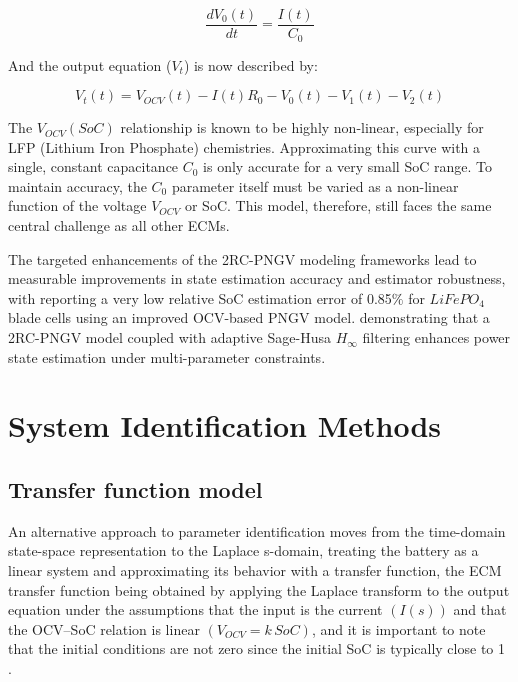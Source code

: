 \documentclass[lettersize,journal]{IEEEtran}
\begin{document}
\begin{equation}
	\label{eq:v0_pngv}
	\frac{dV_0(t)}{dt} =  \frac{I(t)}{C_0}
\end{equation}

And the output equation ($V_t$) is now described by:

\begin{equation}
	\label{eq:vt_pngv}
	V_t(t) = V_{OCV}(t) - I(t)R_0 - V_0(t)-V_1(t)-V_2(t)
\end{equation}

The $V_{OCV}(SoC)$ relationship is known to be highly non-linear, especially for LFP (Lithium Iron Phosphate) chemistries. Approximating this curve with a single, constant capacitance $C_0$ is only accurate for a very small SoC range. To maintain accuracy, the $C_0$ parameter itself must be varied as a non-linear function of the voltage $V_{OCV}$ or SoC\cite{tekin2024comparative}. This model, therefore, still faces the same central challenge as all other ECMs.

The targeted enhancements of the 2RC-PNGV modeling frameworks lead to measurable improvements in state estimation accuracy and estimator robustness, with \cite{Tao2023} reporting a very low relative SoC estimation error of 0.85$\%$ for $LiFePO_4$ blade cells using an improved OCV-based PNGV model\cite{Tao2023,Xinyu2025}. demonstrating that a 2RC-PNGV model coupled with adaptive Sage-Husa $H_{\infty}$ filtering enhances power state estimation under multi-parameter constraints\cite{Xinyu2025}.

\section{System Identification Methods}

\subsection{Transfer function model}

An alternative approach to parameter identification moves from the time-domain state-space representation to the Laplace s-domain, treating the battery as a linear system and approximating its behavior with a transfer function, the ECM transfer function being obtained by applying the Laplace transform to the output equation under the assumptions that the input is the current $\left(I(s)\right)$ and that the OCV–SoC relation is linear $\left(V_{OCV}=k\,SoC\right)$, and it is important to note that the initial conditions are not zero since the initial SoC is typically close to 1 .
\end{document}
